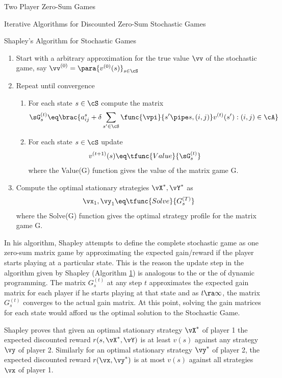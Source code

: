\documentclass{article}
\begin{document}
\begin{psection}{Two Player Zero-Sum Games}
\begin{psubsection}{Iterative Algorithms for Discounted Zero-Sum Stochastic Games}
		\begin{algo}[0.9\textwidth]{Shapley's Algorithm for Stochastic Games}
			\begin{enumerate}
				\item Start with a arbitrary approximation for the true value $\vv$ of the stochastic game, say $\vv^{(0)} = \para{v^{(0)}(s)}_{s \in \cS}$
				\item Repeat until convergence
					\begin{enumerate}
						\item For each state $s \in \cS$ compute the matrix
							\begin{align*}
								\sG_s^{(t)} \eq \brac{a^s_{ij} + \delta \sum_{s' \in \cS} \func{\vpi}{s' \pipe s, (i, j)} v^{(t)}(s') : (i, j) \in \cA}
							\end{align*}
						\item For each state $s \in \cS$ update
							\begin{align*}
								v^{(t + 1)}(s) \eq \tfunc{Value}{\sG_s^{(t)}}
							\end{align*}
							where the Value(G) function gives the value of the matrix game G.
					\end{enumerate}
				\item Compute the optimal stationary strategies $\vX^\ast, \vY^\ast$ as
					\begin{align*}
						\vx_1, \vy_1 \eq \tfunc{Solve}{G_s^{(T)}}
					\end{align*}
					where the Solve(G) function gives the optimal strategy profile for the matrix game G.
			\end{enumerate}
		\end{algo}

		In his algorithm, Shapley attempts to define the complete stochastic game as one zero-sum matrix game by approximating the expected gain/reward if the player starts playing at a particular state. This is the reason the update step in the algorithm given by Shapley (Algorithm \hyperlink{algo:1}{1}) is analogous to the  or the  of dynamic programming. The matrix $G_s^{(t)}$ at any step $t$ approximates the expected gain matrix for each player if he starts playing at that state and as $t \ra \infty$, the matrix $G_s^{(t)}$ converges to the actual gain matrix. At this point, solving the gain matrices for each state would afford us the optimal solution to the Stochastic Game.

		Shapley proves that given an optimal stationary strategy $\vX^\ast$ of player 1 the expected discounted reward $r(s, \vX^\ast, \vY)$ is at least $v(s)$ against any strategy $\vy$ of player 2. Similarly for an optimal stationary strategy $\vy^\ast$ of player 2, the expected discounted reward $r(\vx, \vy^\ast)$ is at most $v(s)$ against all strategies $\vx$ of player 1.


\end{psubsection}
\end{psection}
\end{document}
